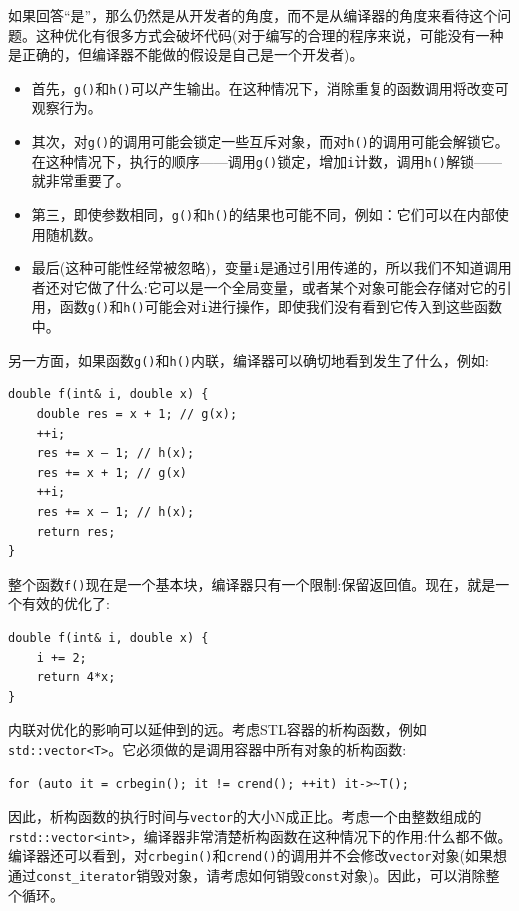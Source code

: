 如果回答“是”，那么仍然是从开发者的角度，而不是从编译器的角度来看待这个问题。这种优化有很多方式会破坏代码(对于编写的合理的程序来说，可能没有一种是正确的，但编译器不能做的假设是自己是一个开发者)。 

\begin{itemize}
\item
首先，\texttt{g()}和\texttt{h()}可以产生输出。在这种情况下，消除重复的函数调用将改变可观察行为。 

\item
其次，对\texttt{g()}的调用可能会锁定一些互斥对象，而对\texttt{h()}的调用可能会解锁它。在这种情况下，执行的顺序——调用\texttt{g()}锁定，增加\texttt{i}计数，调用\texttt{h()}解锁——就非常重要了。 

\item
第三，即使参数相同，\texttt{g()}和\texttt{h()}的结果也可能不同，例如：它们可以在内部使用随机数。 

\item
最后(这种可能性经常被忽略)，变量\texttt{i}是通过引用传递的，所以我们不知道调用者还对它做了什么:它可以是一个全局变量，或者某个对象可能会存储对它的引用，函数\texttt{g()}和\texttt{h()}可能会对\texttt{i}进行操作，即使我们没有看到它传入到这些函数中。 
	
\end{itemize}

另一方面，如果函数\texttt{g()}和\texttt{h()}内联，编译器可以确切地看到发生了什么，例如:

\begin{lstlisting}[style=styleCXX]
double f(int& i, double x) {
	double res = x + 1; // g(x);
	++i;
	res += x – 1; // h(x);
	res += x + 1; // g(x)
	++i;
	res += x – 1; // h(x);
	return res;
}
\end{lstlisting}

整个函数\texttt{f()}现在是一个基本块，编译器只有一个限制:保留返回值。现在，就是一个有效的优化了:

\begin{lstlisting}[style=styleCXX]
double f(int& i, double x) {
	i += 2;
	return 4*x;
}
\end{lstlisting}

内联对优化的影响可以延伸到的远。考虑STL容器的析构函数，例如\texttt{std::vector<T>}。它必须做的是调用容器中所有对象的析构函数:

\begin{lstlisting}[style=styleCXX]
for (auto it = crbegin(); it != crend(); ++it) it->~T();
\end{lstlisting}

因此，析构函数的执行时间与\texttt{vector}的大小N成正比。考虑一个由整数组成的\texttt{rstd::vector<int>}，编译器非常清楚析构函数在这种情况下的作用:什么都不做。编译器还可以看到，对\texttt{crbegin()}和\texttt{crend()}的调用并不会修改\texttt{vector}对象(如果想通过\texttt{const\_iterator}销毁对象，请考虑如何销毁\texttt{const}对象)。因此，可以消除整个循环。

